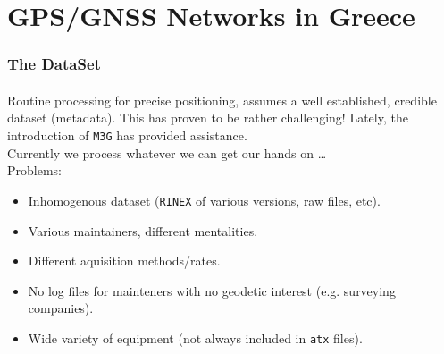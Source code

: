 \section{GPS/GNSS Networks in Greece}

\begin{frame}\frametitle{The DataSet}\framesubtitle{}
\vskip-1.5cm
  Routine processing for precise positioning, assumes a well established, 
  credible dataset (metadata). This has proven to be rather challenging! Lately, 
  the introduction of \texttt{M3G} has provided assistance.\\
  \bigskip
  Currently we process whatever we can get our hands on \ldots\\
  Problems:
  \begin{itemize}
    \item Inhomogenous dataset (\texttt{RINEX} of various versions, raw files, etc).
    \item Various maintainers, different mentalities.
    \item Different aquisition methods/rates.
    \item No log files for mainteners with no geodetic interest (e.g. surveying companies).
    \item Wide variety of equipment (not always included in \texttt{atx} files).
  \end{itemize}
\end{frame}
\note


